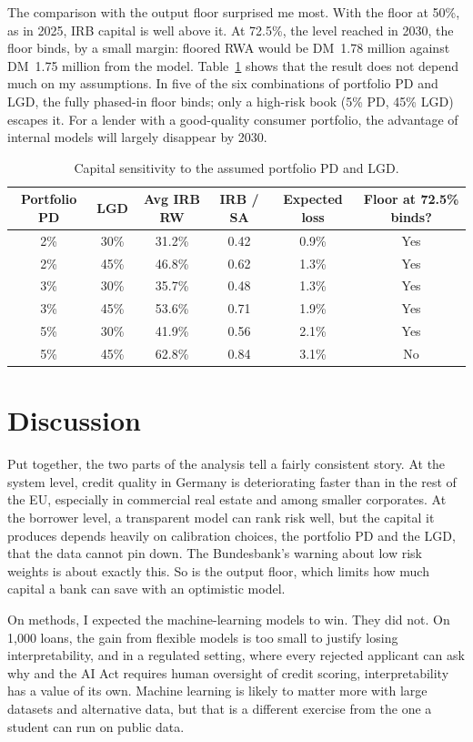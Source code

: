 \documentclass[11pt,a4paper]{article}
\begin{document}
The comparison with the output floor surprised me most. With the floor at 50\%, as in 2025, IRB capital is well above it. At 72.5\%, the level reached in 2030, the floor binds, by a small margin: floored RWA would be DM~1.78 million against DM~1.75 million from the model. Table~\ref{tab:sens} shows that the result does not depend much on my assumptions. In five of the six combinations of portfolio PD and LGD, the fully phased-in floor binds; only a high-risk book (5\% PD, 45\% LGD) escapes it. For a lender with a good-quality consumer portfolio, the advantage of internal models will largely disappear by 2030.

\begin{table}[H]\centering\small
\caption{Capital sensitivity to the assumed portfolio PD and LGD.}\label{tab:sens}
\begin{tabular}{cccccc}
\toprule
Portfolio PD & LGD & Avg IRB RW & IRB / SA & Expected loss & Floor at 72.5\% binds? \\
\midrule
2\% & 30\% & 31.2\% & 0.42 & 0.9\% & Yes \\
2\% & 45\% & 46.8\% & 0.62 & 1.3\% & Yes \\
3\% & 30\% & 35.7\% & 0.48 & 1.3\% & Yes \\
3\% & 45\% & 53.6\% & 0.71 & 1.9\% & Yes \\
5\% & 30\% & 41.9\% & 0.56 & 2.1\% & Yes \\
5\% & 45\% & 62.8\% & 0.84 & 3.1\% & No \\
\bottomrule
\end{tabular}
\end{table}

\section{Discussion}
Put together, the two parts of the analysis tell a fairly consistent story. At the system level, credit quality in Germany is deteriorating faster than in the rest of the EU, especially in commercial real estate and among smaller corporates. At the borrower level, a transparent model can rank risk well, but the capital it produces depends heavily on calibration choices, the portfolio PD and the LGD, that the data cannot pin down. The Bundesbank's warning about low risk weights is about exactly this. So is the output floor, which limits how much capital a bank can save with an optimistic model.

On methods, I expected the machine-learning models to win. They did not. On 1,000 loans, the gain from flexible models is too small to justify losing interpretability, and in a regulated setting, where every rejected applicant can ask why and the AI Act requires human oversight of credit scoring, interpretability has a value of its own. Machine learning is likely to matter more with large datasets and alternative data, but that is a different exercise from the one a student can run on public data.
\end{document}
